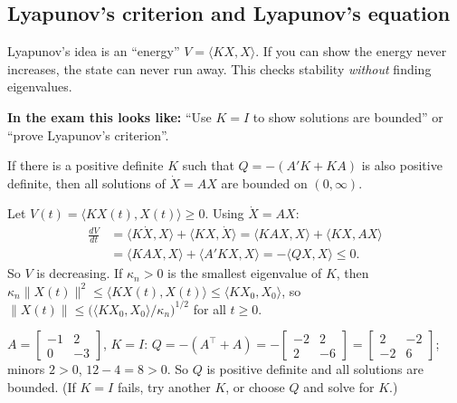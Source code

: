 \subsection{Lyapunov's criterion and Lyapunov's equation \texorpdfstring{}{}}\label{ss:5-9}
\begin{plainbox}
Lyapunov's idea is an ``energy'' $V=\langle KX,X\rangle$. If you can show the energy never increases, the state can never run away.
This checks stability \emph{without} finding eigenvalues.
\par\smallskip\textbf{In the exam this looks like:} ``Use $K=I$ to show solutions are bounded'' or ``prove Lyapunov's criterion''.
\end{plainbox}
\begin{thmbox}[title={Theorem 0.55 (Lyapunov's criterion)}]
If there is a positive definite $K$ such that $Q=-(A'K+KA)$ is also positive definite, then all solutions of $\dot X=AX$ are bounded on $(0,\infty)$.
\end{thmbox}
\begin{proofbox}[title={Proof of Lyapunov's criterion (learn this)}]
Let $V(t)=\langle KX(t),X(t)\rangle\ge0$. Using $\dot X=AX$:
\begin{align*}\frac{dV}{dt}&=\langle K\dot X,X\rangle+\langle KX,\dot X\rangle=\langle KAX,X\rangle+\langle KX,AX\rangle\\&=\langle KAX,X\rangle+\langle A'KX,X\rangle=-\langle QX,X\rangle\le0.\end{align*}
So $V$ is decreasing. If $\kappa_n>0$ is the smallest eigenvalue of $K$, then
$\kappa_n\|X(t)\|^2\le\langle KX(t),X(t)\rangle\le\langle KX_0,X_0\rangle$, so $\|X(t)\|\le\big(\langle KX_0,X_0\rangle/\kappa_n\big)^{1/2}$ for all $t\ge0$.
\end{proofbox}
\begin{workbox}[title={Worked example: try $K=I$}]
$A=\begin{bmatrix}-1&2\\0&-3\end{bmatrix}$, $K=I$: $Q=-(A^\top+A)=-\begin{bmatrix}-2&2\\2&-6\end{bmatrix}=\begin{bmatrix}2&-2\\-2&6\end{bmatrix}$; minors $2>0$, $12-4=8>0$. So $Q$ is positive definite and all solutions are bounded.
(If $K=I$ fails, try another $K$, or choose $Q$ and solve for $K$.)
\end{workbox}
